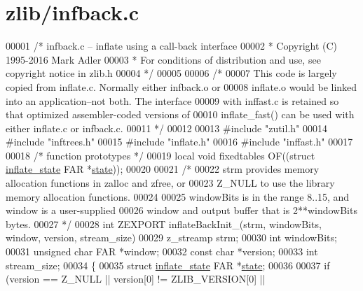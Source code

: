 \hypertarget{zlib_2infback_8c_source}{}\section{zlib/infback.c}
\label{zlib_2infback_8c_source}

\begin{DoxyCode}
00001 \textcolor{comment}{/* infback.c -- inflate using a call-back interface}
00002 \textcolor{comment}{ * Copyright (C) 1995-2016 Mark Adler}
00003 \textcolor{comment}{ * For conditions of distribution and use, see copyright notice in zlib.h}
00004 \textcolor{comment}{ */}
00005 
00006 \textcolor{comment}{/*}
00007 \textcolor{comment}{   This code is largely copied from inflate.c.  Normally either infback.o or}
00008 \textcolor{comment}{   inflate.o would be linked into an application--not both.  The interface}
00009 \textcolor{comment}{   with inffast.c is retained so that optimized assembler-coded versions of}
00010 \textcolor{comment}{   inflate\_fast() can be used with either inflate.c or infback.c.}
00011 \textcolor{comment}{ */}
00012 
00013 \textcolor{preprocessor}{#include "zutil.h"}
00014 \textcolor{preprocessor}{#include "inftrees.h"}
00015 \textcolor{preprocessor}{#include "inflate.h"}
00016 \textcolor{preprocessor}{#include "inffast.h"}
00017 
00018 \textcolor{comment}{/* function prototypes */}
00019 local \textcolor{keywordtype}{void} fixedtables OF((\textcolor{keyword}{struct} \hyperlink{structinflate__state}{inflate\_state} FAR *\hyperlink{structstate}{state}));
00020 
00021 \textcolor{comment}{/*}
00022 \textcolor{comment}{   strm provides memory allocation functions in zalloc and zfree, or}
00023 \textcolor{comment}{   Z\_NULL to use the library memory allocation functions.}
00024 \textcolor{comment}{}
00025 \textcolor{comment}{   windowBits is in the range 8..15, and window is a user-supplied}
00026 \textcolor{comment}{   window and output buffer that is 2**windowBits bytes.}
00027 \textcolor{comment}{ */}
00028 \textcolor{keywordtype}{int} ZEXPORT inflateBackInit\_(strm, windowBits, window, version, stream\_size)
00029 z\_streamp strm;
00030 \textcolor{keywordtype}{int} windowBits;
00031 \textcolor{keywordtype}{unsigned} \textcolor{keywordtype}{char} FAR *window;
00032 \textcolor{keyword}{const} \textcolor{keywordtype}{char} *version;
00033 \textcolor{keywordtype}{int} stream\_size;
00034 \{
00035     \textcolor{keyword}{struct }\hyperlink{structinflate__state}{inflate\_state} FAR *\hyperlink{structstate}{state};
00036 
00037     \textcolor{keywordflow}{if} (version == Z\_NULL || version[0] != ZLIB\_VERSION[0] ||

\end{DoxyCode}
